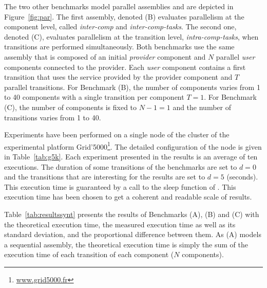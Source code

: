The two other benchmarks model \mad parallel assemblies and are
depicted in Figure~\ref{fig:par}. The first assembly, denoted (B)
evaluates parallelism at the component level, called \emph{inter-comp}
and \emph{inter-comp-tasks}. The second one, denoted (C), evaluates
parallelism at the transition level, \ie \emph{intra-comp-tasks}, when
transitions are performed simultaneously.
%
Both benchmarks use the same assembly that is composed of an initial
\emph{provider} component and $N$ parallel \emph{user} components
connected to the provider. Each \emph{user} component contains a first
transition that uses the service provided by the provider component
and $T$ parallel transitions. For Benchmark (B), the number of
components varies from 1 to 40 components with a single transition per
component $T=1$. For Benchmark (C), the number of components is fixed
to $N-1=1$ and the number of transitions varies from 1 to 40.

Experiments have been performed on a single node of the \ecotype
cluster of the experimental platform
Grid'5000\footnote{\url{www.grid5000.fr}}. The detailed configuration
of the node is given in Table~\ref{tab:g5k}. Each experiment presented
in the results is an average of ten executions. The duration of some
transitions of the benchmarks are set to $d=0$ and the transitions
that are interesting for the results are set to $d=5$ (seconds). This
execution time is guaranteed by a call to the sleep function of
\python. This execution time has been chosen to get a coherent and
readable scale of results.


Table~\ref{tab:resultssynt} presents the results of Benchmarks (A),
(B) and (C) with the theoretical execution time, the measured
execution time as well as its standard deviation, and the proportional
difference between them. As (A) models a sequential assembly, the
theoretical execution time is simply the sum of the execution time of
each transition of each component ($N$ components).
%
 
